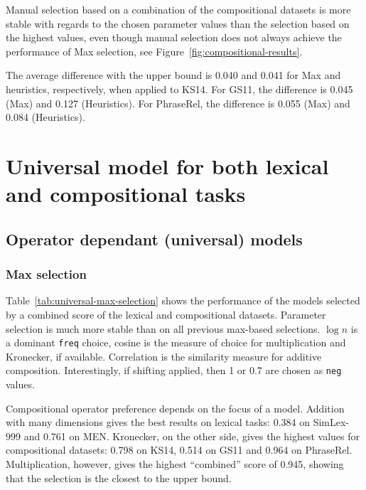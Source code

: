 Manual selection based on a combination of the compositional datasets is more stable with regards to the chosen parameter values than the selection based on the highest values, even though manual selection does not always achieve the performance of Max selection, see Figure~\ref{fig:compositional-results}.

The average difference with the upper bound is 0.040 and 0.041 for Max and heuristics, respectively, when applied to KS14. For GS11, the difference is 0.045 (Max) and 0.127 (Heuristics). For PhraseRel, the difference is 0.055 (Max) and 0.084 (Heuristics).

\chapter[Universal model]{Universal model for both lexical and compositional tasks}
\label{sec:universal-param-selection}


\section{Operator dependant (universal) models}
\label{sec:model-selection}

\subsection{Max selection}
\label{sec:max-selection-universal}

Table~\ref{tab:universal-max-selection} shows the performance of the models selected by a combined score of the lexical and compositional datasets. Parameter selection is much more stable than on all previous max-based selections. $\log n$ is a dominant \texttt{freq} choice, cosine is the measure of choice for multiplication and Kronecker, if available. Correlation is the similarity measure for additive composition. Interestingly, if shifting applied, then 1 or 0.7 are chosen as \texttt{neg} values.

Compositional operator preference depends on the focus of a model.
Addition with many dimensions gives the best results on lexical tasks: 0.384 on SimLex-999 and 0.761 on MEN. Kronecker, on the other side, gives the highest values for compositional datasets: 0.798 on KS14, 0.514 on GS11 and 0.964 on PhraseRel. Multiplication, however, gives the highest ``combined'' score of 0.945, showing that the selection is the closest to the upper bound.

